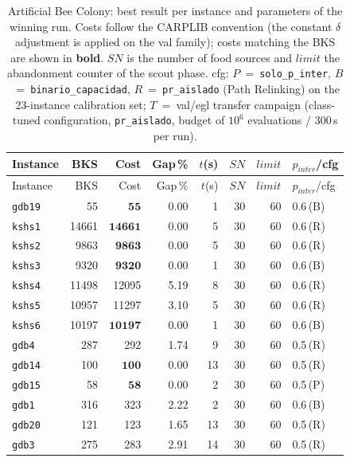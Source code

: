 \begingroup\scriptsize
\begin{longtable}{lrrrrrrl}
\caption{Artificial Bee Colony: best result per instance and parameters of the winning run. Costs follow the CARPLIB convention (the constant $\delta$ adjustment is applied on the val family); costs matching the BKS are shown in \textbf{bold}. $SN$ is the number of food sources and $\mathit{limit}$ the abandonment counter of the scout phase. cfg: $P$~=~\texttt{solo\_p\_inter}, $B$~=~\texttt{binario\_capacidad}, $R$~=~\texttt{pr\_aislado} (Path Relinking) on the 23-instance calibration set; $T$~=~val/egl transfer campaign (class-tuned configuration, \texttt{pr\_aislado}, budget of $10^6$ evaluations / 300\,s per run).}\label{tab:abc-per-instance}\\
\toprule
Instance & BKS & Cost & Gap\,\% & $t$(s) & $SN$ & $\mathit{limit}$ & $p_{inter}$/cfg \\
\midrule
\endfirsthead
\toprule
Instance & BKS & Cost & Gap\,\% & $t$(s) & $SN$ & $\mathit{limit}$ & $p_{inter}$/cfg \\
\midrule
\endhead
\bottomrule
\endfoot
\texttt{gdb19} & 55 & $\mathbf{55}$ & 0.00 & 1 & 30 & 60 & 0.6\,(B) \\
\texttt{kshs1} & 14661 & $\mathbf{14661}$ & 0.00 & 5 & 30 & 60 & 0.6\,(R) \\
\texttt{kshs2} & 9863 & $\mathbf{9863}$ & 0.00 & 5 & 30 & 60 & 0.6\,(R) \\
\texttt{kshs3} & 9320 & $\mathbf{9320}$ & 0.00 & 1 & 30 & 60 & 0.6\,(B) \\
\texttt{kshs4} & 11498 & 12095 & 5.19 & 8 & 30 & 60 & 0.6\,(R) \\
\texttt{kshs5} & 10957 & 11297 & 3.10 & 5 & 30 & 60 & 0.6\,(R) \\
\texttt{kshs6} & 10197 & $\mathbf{10197}$ & 0.00 & 1 & 30 & 60 & 0.6\,(B) \\
\texttt{gdb4} & 287 & 292 & 1.74 & 9 & 30 & 60 & 0.5\,(R) \\
\texttt{gdb14} & 100 & $\mathbf{100}$ & 0.00 & 13 & 30 & 60 & 0.5\,(R) \\
\texttt{gdb15} & 58 & $\mathbf{58}$ & 0.00 & 2 & 30 & 60 & 0.5\,(P) \\
\texttt{gdb1} & 316 & 323 & 2.22 & 2 & 30 & 60 & 0.6\,(B) \\
\texttt{gdb20} & 121 & 123 & 1.65 & 13 & 30 & 60 & 0.5\,(R) \\
\texttt{gdb3} & 275 & 283 & 2.91 & 14 & 30 & 60 & 0.5\,(R) \\

\end{longtable}

